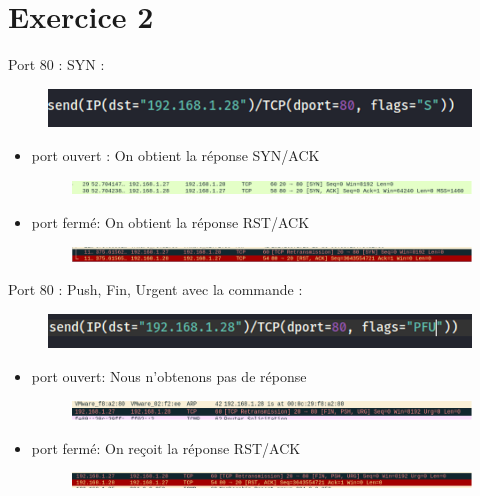 \documentclass[12pt, oneside]{article}
\begin{document}
\section{Exercice 2}
Port 80 : SYN :
\begin{figure}[H]
\centering
\includegraphics[scale=0.7]{8}
\end{figure}
\begin{itemize}
\item port ouvert :  On obtient la réponse SYN/ACK
\begin{figure}[H]
\centering
\includegraphics[scale=0.7]{9}
\end{figure}
\item port fermé: On obtient la réponse RST/ACK
\begin{figure}[H]
\centering
\includegraphics[scale=0.7]{10}
\end{figure}
\end{itemize}

Port 80 : Push, Fin, Urgent avec la commande :
\begin{figure}[H]
\centering
\includegraphics[scale=0.7]{11}
\end{figure}
\begin{itemize}
\item port ouvert: Nous n’obtenons pas de réponse
\begin{figure}[H]
\centering
\includegraphics[scale=0.7]{12}
\end{figure}
\item port fermé: On reçoit la réponse RST/ACK
\begin{figure}[H]
\centering
\includegraphics[scale=0.7]{13}
\end{figure}
\end{itemize}
\end{document}
